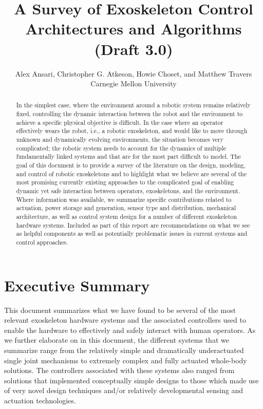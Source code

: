 \documentclass[letterpaper,12pt,fullpage]{article}
\begin{document}
\title{A Survey of Exoskeleton Control Architectures and
Algorithms\\
(Draft 3.0)}

\author{Alex Ansari, Christopher G. Atkeson, Howie Choset, and Matthew Travers\\
Carnegie Mellon University}

\maketitle

\begin{abstract}
In the simplest case, where the environment around a robotic system remains relatively fixed, controlling the dynamic interaction between the robot and the environment to achieve a specific physical objective is difficult.  In the case where an operator effectively wears the robot, i.e., a robotic exoskeleton, and would like to move through unknown and dynamically evolving environments, the situation becomes very complicated; the robotic system needs to account for the dynamics of multiple fundamentally linked systems and that are for the most part difficult to model.  The goal of this document is to provide a survey of the literature on the design, modeling, and control of robotic exoskeletons and to highlight what we believe are several of the most promising currently existing approaches to the complicated goal of enabling dynamic yet safe interaction between operators, exoskeletons, and the environment.  Where information was available, we summarize specific contributions related to actuation, power storage and generation, sensor type and distribution, mechanical architecture, as well as control system design for a number of different exoskeleton hardware systems.  Included as part of this report are recommendations on what we see as helpful components as well as potentially problematic issues in current systems and control approaches. 
\end{abstract}

\section{Executive Summary}

This document summarizes what we have found to be several of the most relevant exoskeleton hardware systems and the associated controllers used to enable the hardware to effectively and safely interact with human operators.  As we further elaborate on in this document, the different systems that we summarize range from the relatively simple and dramatically underactuated single joint mechanisms to extremely complex and fully actuated whole-body solutions.  The controllers associated with these systems also ranged from solutions that implemented conceptually simple designs to those which made use of very novel design techniques and/or relatively developmental sensing and actuation technologies. 
\end{document}
